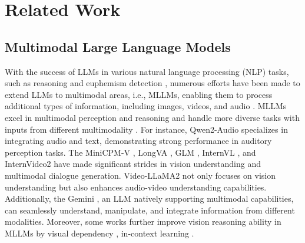 \section{Related Work}
\label{app:related}
\subsection{Multimodal Large Language Models}
With the success of LLMs in various natural language processing (NLP) tasks, such as reasoning \cite{ThoT} and euphemism detection \cite{Euphemism}, numerous efforts have been made to extend LLMs to multimodal areas, i.e., MLLMs, enabling them to process additional types of information, including images, videos, and audio \cite{VideoLLaMA_2,MiniCPM-V}. MLLMs excel in multimodal perception and reasoning and handle more diverse tasks with inputs from different multimodality \cite{MiniGPT4,InternVideo2}. 
For instance, Qwen2-Audio \cite{Qwen2-Audio} specializes in integrating audio and text, demonstrating strong performance in auditory perception tasks. 
The MiniCPM-V \cite{MiniCPM-V}, LongVA \cite{LongVA}, GLM \cite{GLM-4}, InternVL \cite{InternVL}, and InternVideo2 \cite{InternVideo2} have made significant strides in vision understanding and multimodal dialogue generation.
Video-LLaMA2 \cite{VideoLLaMA_2} not only focuses on vision understanding but also enhances audio-video understanding capabilities. Additionally, the Gemini \cite{Gemini1, Gemini, Gemini2}, an LLM natively supporting multimodal capabilities, can seamlessly understand, manipulate, and integrate information from different modalities. 
Moreover, some works further improve vision reasoning ability in MLLMs by visual dependency \cite{VisualDependency}, in-context learning \cite{VICL}.


